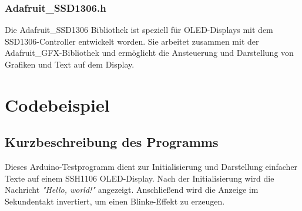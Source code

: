 \subsubsection{Adafruit\_SSD1306.h}
Die Adafruit\_SSD1306 Bibliothek ist speziell für OLED-Displays mit dem SSD1306-Controller entwickelt worden. Sie arbeitet zusammen mit der Adafruit\_GFX-Bibliothek und ermöglicht die Ansteuerung und Darstellung von Grafiken und Text auf dem Display.




\section{Codebeispiel}

\subsection{Kurzbeschreibung des Programms}
Dieses Arduino-Testprogramm dient zur Initialisierung und Darstellung einfacher Texte auf einem SSH1106 OLED-Display. Nach der Initialisierung wird die Nachricht \textit{"Hello, world!"} angezeigt. Anschließend wird die Anzeige im Sekundentakt invertiert, um einen Blinke-Effekt zu erzeugen.






